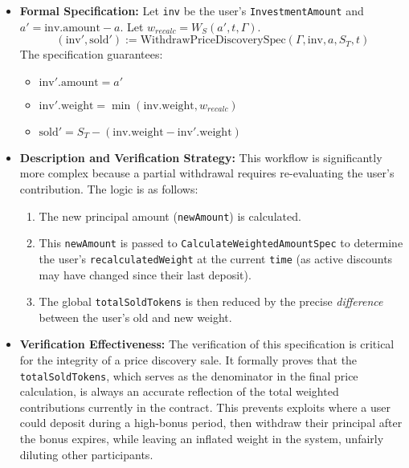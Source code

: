 \documentclass[
  english,
  onecolumn]{article}
\providecommand{\tightlist}{%
  \setlength{\itemsep}{0pt}\setlength{\parskip}{0pt}}
\begin{document}
\begin{itemize}
\tightlist
\item
  \textbf{Formal Specification:} Let \texttt{inv} be the user's
  \texttt{InvestmentAmount} and \(a' = \text{inv.amount} - a\). Let
  \(w_{recalc} = W_S(a', t, \Gamma)\). \[
  (\text{inv}', \text{sold}') := \text{WithdrawPriceDiscoverySpec}(\Gamma, \text{inv}, a, S_T, t)
  \] The specification guarantees:

  \begin{itemize}
  \tightlist
  \item
    \(\text{inv}'.\text{amount} = a'\)
  \item
    \(\text{inv}'.\text{weight} = \min(\text{inv.weight}, w_{recalc})\)
  \item
    \(\text{sold}' = S_T - (\text{inv.weight} - \text{inv}'.\text{weight})\)
  \end{itemize}
\item
  \textbf{Description and Verification Strategy:} This workflow is
  significantly more complex because a partial withdrawal requires
  re-evaluating the user's contribution. The logic is as follows:

  \begin{enumerate}
  \def\labelenumi{\arabic{enumi}.}
  \tightlist
  \item
    The new principal amount (\texttt{newAmount}) is calculated.
  \item
    This \texttt{newAmount} is passed to
    \texttt{CalculateWeightedAmountSpec} to determine the user's
    \texttt{recalculatedWeight} at the current \texttt{time} (as active
    discounts may have changed since their last deposit).
  \item
    The global \texttt{totalSoldTokens} is then reduced by the precise
    \emph{difference} between the user's old and new weight.
  \end{enumerate}
\item
  \textbf{Verification Effectiveness:} The verification of this
  specification is critical for the integrity of a price discovery sale.
  It formally proves that the \texttt{totalSoldTokens}, which serves as
  the denominator in the final price calculation, is always an accurate
  reflection of the total weighted contributions currently in the
  contract. This prevents exploits where a user could deposit during a
  high-bonus period, then withdraw their principal after the bonus
  expires, while leaving an inflated weight in the system, unfairly
  diluting other participants.
\end{itemize}
\end{document}
